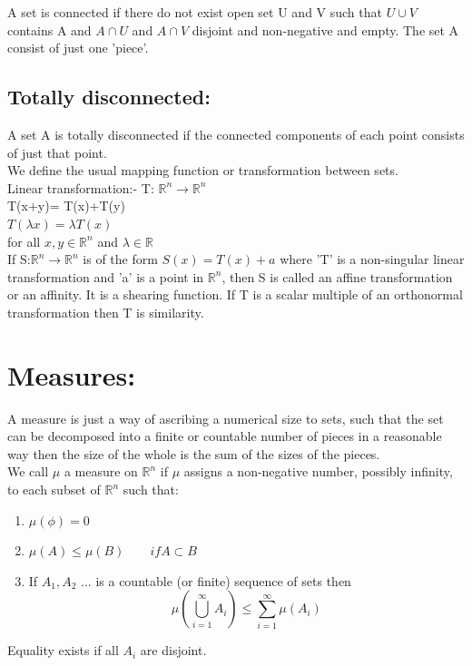 \documentclass[14pt]{extarticle}
\begin{document}
\begin{enumerate}
A set is connected if there do not exist open set U and V such that $U \cup V$ contains A and $A \cap U$ and $A \cap V$ disjoint and non-negative and empty. The set A consist of just one 'piece'. 

\subsection{Totally disconnected:}

A set A is totally disconnected if the connected components of each point consists of just that point.\\

We define the usual mapping function or transformation between sets.\\
Linear transformation:- T: $\mathbb{R}^n \rightarrow \mathbb{R}^n$\\
T(x+y)= T(x)+T(y)\\
$T(\lambda x)= \lambda T(x)$\\
for all $x,y \in \mathbb{R}^n$ and $\lambda \in \mathbb{R}$\\

If S:$\mathbb{R}^n \rightarrow \mathbb{R}^n$ is of the form $S(x)=T(x)+a$ where 'T' is a non-singular linear transformation and 'a' is a point in $\mathbb{R}^n$, then S is called an affine transformation or an affinity. It is a shearing function. If T is a scalar multiple of an orthonormal transformation then T is similarity.
\pagebreak

\section{Measures:}

A measure is just a way of ascribing a numerical size to sets, such that the set can be decomposed into a finite or countable number of pieces in a reasonable way then the size of the whole is the sum of the sizes of the pieces.\\

We call $\mu$ a measure on $\mathbb{R}^n$ if $\mu$  assigns a non-negative number, possibly infinity, to each subset of $\mathbb{R}^n$ such that:\\

\begin{enumerate}
\item $\mu(\phi)=0$
\item $\mu(A) \leq \mu(B) \quad \quad if A \subset B$
\item If $A_1, A_2$ ... is a countable (or finite) sequence of sets then\\

$$\mu \left( \bigcup_{i=1}^{\infty} A_i \right) \leq \sum_{i=1}^{\infty} \mu(A_i)$$
\end{enumerate}
Equality exists if all $A_i$ are disjoint.\\
\end{enumerate}
\end{document}
